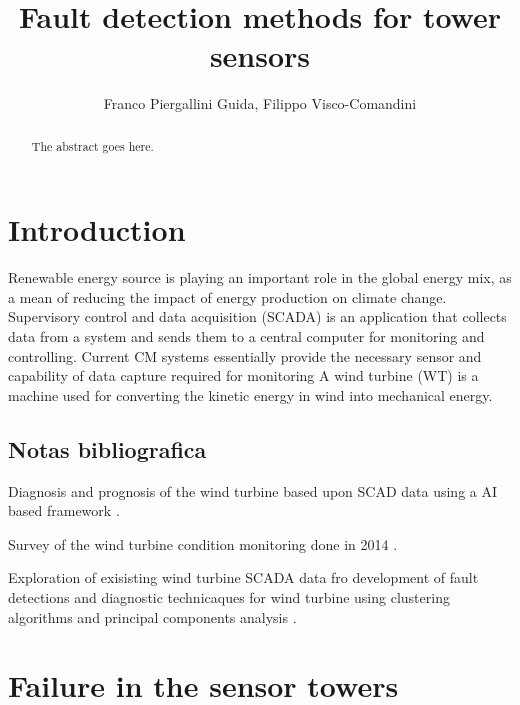 \documentclass[journal]{IEEEtran}
\begin{document}
\title{Fault detection methods for tower sensors}

\author{Franco Piergallini Guida, Filippo Visco-Comandini}%



\maketitle

\begin{abstract}
The abstract goes here.
\end{abstract}
\section{Introduction}
Renewable energy source is playing an important role in the global energy mix, as a mean of reducing the impact of energy production on climate change. \\
Supervisory control and data acquisition (SCADA) is an application that collects data from a system and sends them to a central computer for monitoring and controlling. Current CM systems essentially provide the necessary sensor and capability of data capture required for monitoring
A wind turbine (WT) is a machine used for converting the kinetic energy in wind into mechanical energy. 
\subsection{Notas bibliografica}
Diagnosis and prognosis of the wind turbine based upon SCAD data using a AI based framework \cite{wang2014scada}.

\cite{kusiak2011prediction}

\cite{lu2009review}

\cite{schlechtingen2012condition}

\cite{schlechtingen2011comparative}

\cite{yang2014wind}
Survey of the wind turbine condition monitoring done in 2014 \cite{tchakoua2014wind}.


\cite{wymore2015survey}

Exploration of exisisting wind turbine SCADA data fro development of fault detections and diagnostic technicaques for wind turbine using clustering algorithms and principal components analysis \cite{kim2011use}.

\section{Failure in the sensor towers}
\end{document}
